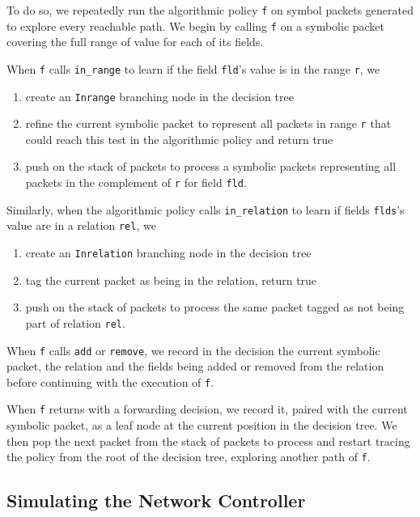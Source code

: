 \documentclass[preprint]{sigplanconf}
\begin{document}
To do so, we repeatedly run the algorithmic policy \lstinline|f| on symbol packets generated to explore every reachable path.
We begin by calling \lstinline|f| on a symbolic packet covering the full range of value for each of its fields.

When \lstinline|f| calls \lstinline|in_range| to learn if the field \lstinline|fld|'s value is in the range \lstinline|r|, we
\begin{enumerate}
\item  create an \lstinline|Inrange| branching node in the decision tree
\item refine the current symbolic packet to represent all packets in range \lstinline|r| that could reach this test in the algorithmic policy and return true
\item push on the stack of packets to process a symbolic packets representing all packets in the complement of \lstinline|r| for field \lstinline|fld|.
\end{enumerate}


Similarly, when the algorithmic policy calls \lstinline|in_relation| to learn if fields \lstinline|flds|'s value are in a relation \lstinline|rel|, we
\begin{enumerate}
  \item create an \lstinline|Inrelation| branching node in the decision tree
  \item tag the current packet as being in the relation, return true
  \item push on the stack of packets to process the same packet tagged as not being part of relation \lstinline|rel|.
\end{enumerate}
When \lstinline|f| calls \lstinline|add| or \lstinline|remove|, we record in the decision the current symbolic packet, the relation and the fields being added or removed from the relation before continuing with the execution of \lstinline|f|.

When \lstinline|f| returns with a forwarding decision, we record it, paired with the current symbolic packet, as a leaf node at the current position in the decision tree. We then pop the next packet from the stack of packets to process and restart tracing the policy from the root of the decision tree, exploring another path of \lstinline|f|.  


\subsection*{Simulating the Network Controller}
\end{document}
